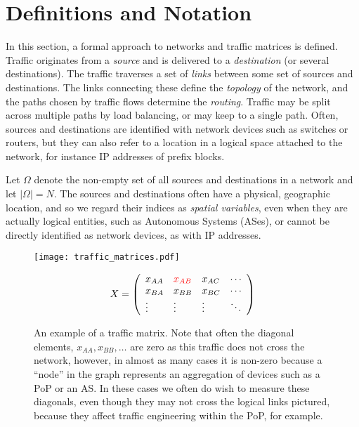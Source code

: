 
\section{Definitions and Notation}
\label{sec:tm}

In this section, a formal approach to networks and traffic matrices is
defined.  Traffic originates from a \emph{source} and is delivered to
a \emph{destination} (or several destinations). The traffic traverses
a set of \emph{links} between some set of sources and destinations.
The links connecting these define the \emph{topology} of the network,
and the paths chosen by traffic flows determine the {\em
  routing}. Traffic may be split across multiple paths by load
balancing, or may keep to a single path.  Often, sources and
destinations are identified with network devices such as switches or
routers, but they can also refer to a location in a logical space
attached to the network, for instance IP addresses of prefix blocks.

Let $\Omega$ denote the non-empty set of all sources and destinations
in a network and let $|\Omega| = N$.  The sources and destinations
often have a physical, geographic location, and so we regard their
indices as {\em spatial variables}, even when they are actually
logical entities, such as Autonomous Systems (ASes), or cannot be
directly identified as network devices, as with IP addresses.

\begin{figure}
  \begin{center}
    \begin{minipage}[m]{0.64\columnwidth}
      \vspace{0pt}
      \texttt{[image: traffic\_matrices.pdf]}      
    \end{minipage}
    \hspace{-10mm}
    \begin{minipage}[m]{0.3\columnwidth}
      \vspace{0pt}
      $$ X = \displaystyle
              \left( \begin{array}{lllll}
                x_{AA} & {\color{red} x_{AB}} & x_{AC} & \cdots \\
                x_{BA} & x_{BB} & x_{BC} & \cdots \\
                \vdots & \vdots & \vdots & \ddots \\
	      \end{array} \right)
    $$
  \end{minipage}
  \caption{An example of a traffic matrix. Note that often the
    diagonal elements, $x_{AA}, x_{BB}, \ldots$ are zero as this
    traffic does not cross the network, however, in almost as many
    cases it is non-zero because a ``node'' in the graph represents an
    aggregation of devices such as a PoP or an AS. In these cases we
    often do wish to measure these diagonals, even though they may not
    cross the logical links pictured, because they affect traffic
    engineering within the PoP, for example.
  \label{fig:tm} }
  \end{center}
\end{figure}


